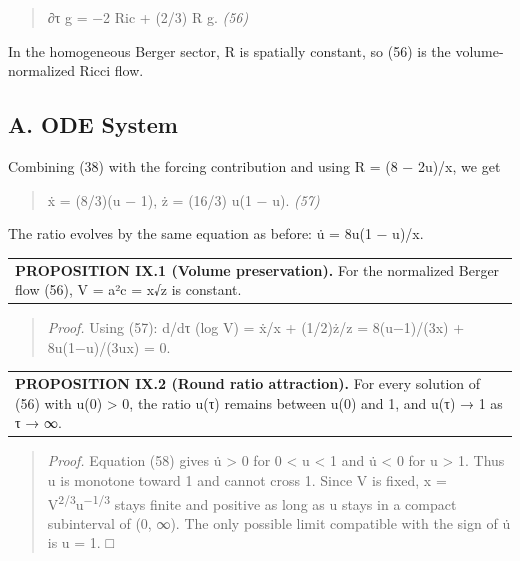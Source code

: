 \documentclass[
]{article}
\begin{document}
\begin{quote}
∂τ g = −2 Ric + (2/3) R g. \emph{(56)}
\end{quote}

In the homogeneous Berger sector, R is spatially constant, so (56) is the volume-normalized Ricci flow.

\subsection{A. ODE System}\label{a.-ode-system}

Combining (38) with the forcing contribution and using R = (8 − 2u)/x, we get

\begin{quote}
ẋ = (8/3)(u − 1), ż = (16/3) u(1 − u). \emph{(57)}
\end{quote}

The ratio evolves by the same equation as before: u̇ = 8u(1 − u)/x.

\begin{longtable}[]{@{}
  >{\raggedright\arraybackslash}p{}@{}}
\toprule\noalign{}
\endhead
\bottomrule\noalign{}
\endlastfoot
\textbf{PROPOSITION IX.1 (Volume preservation).} For the normalized Berger flow (56), V = a²c = x√z is constant. \\
\end{longtable}

\begin{quote}
\emph{Proof.} Using (57): d/dτ (log V) = ẋ/x + (1/2)ż/z = 8(u−1)/(3x) + 8u(1−u)/(3ux) = 0.
\end{quote}

\begin{longtable}[]{@{}
  >{\raggedright\arraybackslash}p{}@{}}
\toprule\noalign{}
\endhead
\bottomrule\noalign{}
\endlastfoot
\textbf{PROPOSITION IX.2 (Round ratio attraction).} For every solution of (56) with u(0) \textgreater{} 0, the ratio u(τ) remains between u(0) and 1, and u(τ) → 1 as τ → ∞. \\
\end{longtable}

\begin{quote}
\emph{Proof.} Equation (58) gives u̇ \textgreater{} 0 for 0 \textless{} u \textless{} 1 and u̇ \textless{} 0 for u \textgreater{} 1. Thus u is monotone toward 1 and cannot cross 1. Since V is fixed, x = V\textsuperscript{2/3}u\textsuperscript{−1/3} stays finite and positive as long as u stays in a compact subinterval of (0, ∞). The only possible limit compatible with the sign of u̇ is u = 1. □
\end{quote}
\end{document}

